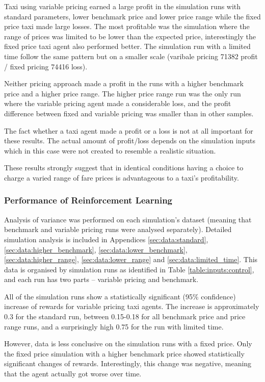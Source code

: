 Taxi using variable pricing earned a large profit in the simulation runs with
standard parameters, lower benchmark price and lower price range while the
fixed price taxi made large losses. The most profitable was the simulation
where the range of prices was limited to be lower than the expected price,
interestingly the fixed price taxi agent also performed better. The simulation
run with a limited time follow the same pattern but on a smaller scale
(varibale pricing 71382 profit / fixed pricing 74416 loss).

Neither pricing approach made a profit in the runs with a higher benchmark
price and a higher price range. The higher price range run was the only run
where the variable pricing agent made a considerable loss, and the profit
difference between fixed and variable pricing was smaller than in other
samples.

The fact whether a taxi agent made a profit or a loss is not at all important
for these results. The actual amount of profit/loss depends on the simulation
inputs which in this case were not created to resemble a realistic situation.

These results strongly suggest that in identical conditions having a choice to
charge a varied range of fare prices is advantageous to a taxi's profitability.


\subsubsection{Performance of Reinforcement Learning}
\label{sec:results:stats}

Analysis of variance was performed on each simulation's dataset (meaning that
benchmark and variable pricing runs were analysed separately). Detailed
simulation analysis is included in Appendices \ref{sec:data:standard},
\ref{sec:data:higher_benchmark}, \ref{sec:data:lower_benchmark},
\ref{sec:data:higher_range}, \ref{sec:data:lower_range} and
\ref{sec:data:limited_time}. This data is organised by simulation runs as
identified in Table \ref{table:inputs:control}, and each run has two parts --
variable pricing and benchmark.

All of the simulation runs show a statistically significant (95\% confidence)
increase of rewards for variable pricing taxi agents. The increase is
approximately 0.3 for the standard run, between 0.15-0.18 for all benchmark
price and price range runs, and a surprisingly high 0.75 for the run with
limited time.

However, data is less conclusive on the simulation runs with a fixed price.
Only the fixed price simulation with a higher benchmark price showed
statistically significant changes of rewards. Interestingly, this change was
negative, meaning that the agent actually got worse over time.

